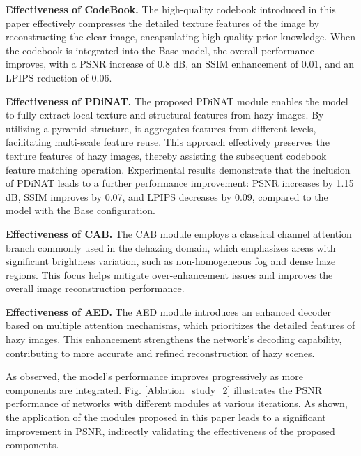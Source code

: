 \documentclass[lettersize,journal]{IEEEtran}
\begin{document}
{\bf{Effectiveness of CodeBook.}} The high-quality codebook introduced in this paper effectively compresses the detailed texture features of the image by reconstructing the clear image, encapsulating high-quality prior knowledge. When the codebook is integrated into the Base model, the overall performance improves, with a PSNR increase of 0.8 dB, an SSIM enhancement of 0.01, and an LPIPS reduction of 0.06.

{\bf{Effectiveness of PDiNAT.}} The proposed PDiNAT module enables the model to fully extract local texture and structural features from hazy images. By utilizing a pyramid structure, it aggregates features from different levels, facilitating multi-scale feature reuse. This approach effectively preserves the texture features of hazy images, thereby assisting the subsequent codebook feature matching operation. Experimental results demonstrate that the inclusion of PDiNAT leads to a further performance improvement: PSNR increases by 1.15 dB, SSIM improves by 0.07, and LPIPS decreases by 0.09, compared to the model with the Base configuration.

{\bf{Effectiveness of CAB.}} The CAB module employs a classical channel attention branch commonly used in the dehazing domain, which emphasizes areas with significant brightness variation, such as non-homogeneous fog and dense haze regions. This focus helps mitigate over-enhancement issues and improves the overall image reconstruction performance.

{\bf{Effectiveness of AED.}} The AED module introduces an enhanced decoder based on multiple attention mechanisms, which prioritizes the detailed features of hazy images. This enhancement strengthens the network’s decoding capability, contributing to more accurate and refined reconstruction of hazy scenes.

As observed, the model's performance improves progressively as more components are integrated. Fig. \ref{Ablation_study_2} illustrates the PSNR performance of networks with different modules at various iterations. As shown, the application of the modules proposed in this paper leads to a significant improvement in PSNR, indirectly validating the effectiveness of the proposed components.
\end{document}
